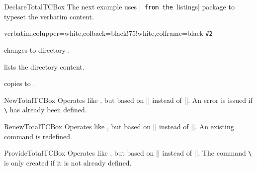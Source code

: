 \begin{docCommand}{DeclareTotalTCBox}{}
The next example uses |\lstinline| from the |listings| package to
typeset the verbatim content.

\begin{dispExample}
{verbatim,colupper=white,colback=black!75!white,colframe=black}
{%
  \lstinline[language=command.com,keywordstyle=\color{blue!35!white}\bfseries]^#2^}

 changes to directory .

 lists the directory content.

 copies  to
  .
\end{dispExample}
\end{docCommand}

\clearpage
\begin{docCommand}{NewTotalTCBox}{}
  Operates like , but based on |\NewDocumentCommand| instead of |\DeclareDocumentCommand|.
  An error is issued if \texttt{\textbackslash} has already been defined.
\end{docCommand}

\begin{docCommand}{RenewTotalTCBox}{}
  Operates like , but based on |\RenewDocumentCommand| instead of |\DeclareDocumentCommand|.
  An existing command is redefined.
\end{docCommand}

\begin{docCommand}{ProvideTotalTCBox}{}
  Operates like , but based on |\ProvideDocumentCommand| instead of |\DeclareDocumentCommand|.
  The command \texttt{\textbackslash} is only created if it is not already defined.
\end{docCommand}


